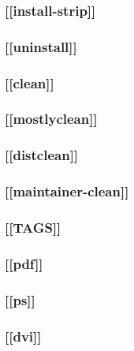 \documentclass{article}
\begin{document}
\subsubsection{[[install-strip]]}
\label{sec:general-structure:std-targets:install-strip}

\subsubsection{[[uninstall]]}
\label{sec:general-structure:std-targets:uninstall}


\subsubsection{[[clean]]}
\label{sec:general-structure:std-targets:clean}


\subsubsection{[[mostlyclean]]}
\label{sec:general-structure:std-targets:mostlyclean}


\subsubsection{[[distclean]]}
\label{sec:general-structure:std-targets:distclean}


\subsubsection{[[maintainer-clean]]}
\label{sec:general-structure:std-targets:maintainer-clean}


\subsubsection{[[TAGS]]}
\label{sec:general-structure:std-targets:TAGS}


\subsubsection{[[pdf]]}
\label{sec:general-structure:std-targets:pdf}

\subsubsection{[[ps]]}
\label{sec:general-structure:std-targets:ps}

\subsubsection{[[dvi]]}
\label{sec:general-structure:std-targets:dvi}
\end{document}
